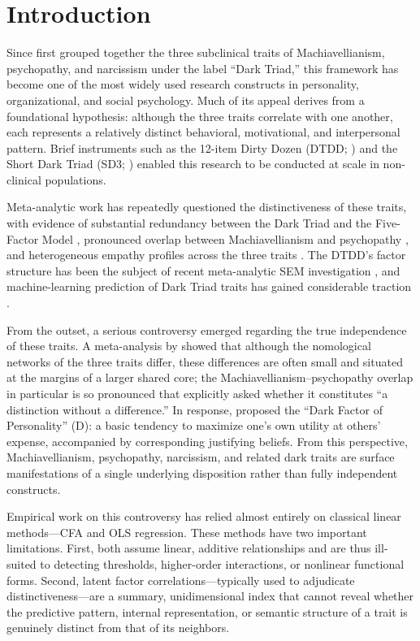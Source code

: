 \documentclass[11pt,twocolumn]{article}
\begin{document}
\section{Introduction}

Since \citet{paulhus2002} first grouped together the three subclinical traits of Machiavellianism, psychopathy, and narcissism under the label ``Dark Triad,'' this framework has become one of the most widely used research constructs in personality, organizational, and social psychology. Much of its appeal derives from a foundational hypothesis: although the three traits correlate with one another, each represents a relatively distinct behavioral, motivational, and interpersonal pattern. Brief instruments such as the 12-item Dirty Dozen (DTDD; \citealp{jonason2010}) and the Short Dark Triad (SD3; \citealp{jones2014}) enabled this research to be conducted at scale in non-clinical populations.

Meta-analytic work has repeatedly questioned the distinctiveness of these traits, with evidence of substantial redundancy between the Dark Triad and the Five-Factor Model \citep{oboyle2015}, pronounced overlap between Machiavellianism and psychopathy \citep{muris2017}, and heterogeneous empathy profiles across the three traits \citep{shukla2025}. The DTDD's factor structure has been the subject of recent meta-analytic SEM investigation \citep{knitter2025}, and machine-learning prediction of Dark Triad traits has gained considerable traction \citep{leberecht2026}.

From the outset, a serious controversy emerged regarding the true independence of these traits. A meta-analysis by \citet{vize2018} showed that although the nomological networks of the three traits differ, these differences are often small and situated at the margins of a larger shared core; the Machiavellianism--psychopathy overlap in particular is so pronounced that \citet{miller2017} explicitly asked whether it constitutes ``a distinction without a difference.'' In response, \citet{moshagen2018} proposed the ``Dark Factor of Personality'' (D): a basic tendency to maximize one's own utility at others' expense, accompanied by corresponding justifying beliefs. From this perspective, Machiavellianism, psychopathy, narcissism, and related dark traits are surface manifestations of a single underlying disposition rather than fully independent constructs.

Empirical work on this controversy has relied almost entirely on classical linear methods---CFA and OLS regression. These methods have two important limitations. First, both assume linear, additive relationships and are thus ill-suited to detecting thresholds, higher-order interactions, or nonlinear functional forms. Second, latent factor correlations---typically used to adjudicate distinctiveness---are a summary, unidimensional index that cannot reveal whether the predictive pattern, internal representation, or semantic structure of a trait is genuinely distinct from that of its neighbors.
\end{document}
